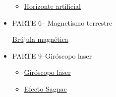 \begin{itemize}
\begin{itemize}
  \item \href{https://www.youtube.com/watch?v=VycrS3VYjeM}{Horizonte
      artificial}
  \end{itemize}

\item PARTE 6-- Magnetismo terrestre

\href {https://www.youtube.com/watch?v=4dDKjdj_Dvc}{Brújula magn\'etica}






\item PARTE 9--Giróscopo laser

  \begin{itemize}
  \item \href{https://www.youtube.com/watch?v=ox-LRneg1VY}{Giróscopo
      laser}

  \item \href{https://www.youtube.com/watch?v=Fk0RvzaHq_Q}{Efecto
      Sagnac}
  \end{itemize}

\end{itemize}








